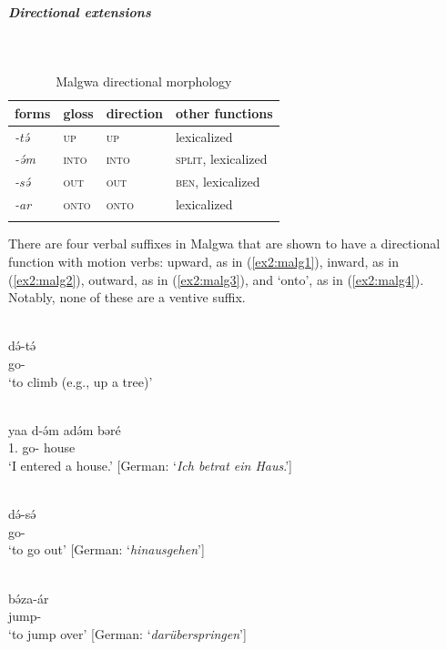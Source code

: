 \subparagraph{Directional extensions}~

\begin{table}[H]
	\caption{Malgwa directional morphology}
	\label{tab:malg}
	\begin{tabular}{llll} %
		\lsptoprule
		forms & gloss & direction  & other functions  \\ %
		\midrule
		\textit{-tə́}  &  \textsc{up}  &   \textsc{up}   &    lexicalized \\
		\textit{-ə́m}  &  \textsc{into}  & \textsc{into}  &  \textsc{split}, lexicalized  \\
		\textit{-sə́}  &  \textsc{out}  &    \textsc{out} &  \textsc{ben}, lexicalized \\
		\textit{-ar}  &  \textsc{onto}  &   \textsc{onto}  &  lexicalized   \\
		\lspbottomrule
	\end{tabular}
\end{table} 

There are four verbal suffixes in Malgwa that are shown to have a directional function with motion verbs: upward, as in (\ref{ex2:malg1}), inward, as in (\ref{ex2:malg2}), outward, as in (\ref{ex2:malg3}), and `onto', as in (\ref{ex2:malg4}). Notably, none of these are a ventive suffix. 

\ea\label{ex2:malg1}
 \\
\gll də́-tə́ \\
go- \\
\glt `to climb (e.g., up a tree)'

\ex\label{ex2:malg2}
 \\
\gll  yaa d-ə́m adə́m bəré	 \\
1. go-  house \\
\glt `I entered a house.' [German: `\textit{Ich betrat ein Haus}.']

\ex\label{ex2:malg3}
 \\
\gll də́-sə́ \\
go- \\
\glt `to go out' [German: `\textit{hinausgehen}']

\ex\label{ex2:malg4}
 \\
\gll bə́za-ár \\
jump- \\
\glt `to jump over' [German: `\textit{darüberspringen}']
\z 

